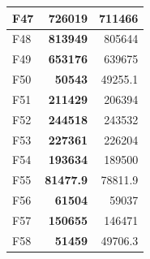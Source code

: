 \begin{table}[]
\begin{tabular}{l|r|r|}
\multicolumn{1}{|l|}{\cellcolor[HTML]{FCE6AB}F47}  & \cellcolor[HTML]{D3FFB6}\textbf{726019}                  & 711466                                                    \\ \hline
\multicolumn{1}{|l|}{\cellcolor[HTML]{FCE6AB}F48}  & \cellcolor[HTML]{D3FFB6}\textbf{813949}                  & 805644                                                    \\ \hline
\multicolumn{1}{|l|}{\cellcolor[HTML]{FCE6AB}F49}  & \cellcolor[HTML]{D3FFB6}\textbf{653176}                  & 639675                                                    \\ \hline
\multicolumn{1}{|l|}{\cellcolor[HTML]{FCE6AB}F50}  & \cellcolor[HTML]{D3FFB6}\textbf{50543}                   & 49255.1                                                   \\ \hline
\multicolumn{1}{|l|}{\cellcolor[HTML]{FCE6AB}F51}  & \cellcolor[HTML]{D3FFB6}\textbf{211429}                  & 206394                                                    \\ \hline
\multicolumn{1}{|l|}{\cellcolor[HTML]{FCE6AB}F52}  & \cellcolor[HTML]{D3FFB6}\textbf{244518}                  & 243532                                                    \\ \hline
\multicolumn{1}{|l|}{\cellcolor[HTML]{FCE6AB}F53}  & \cellcolor[HTML]{D3FFB6}\textbf{227361}                  & 226204                                                    \\ \hline
\multicolumn{1}{|l|}{\cellcolor[HTML]{FCE6AB}F54}  & \cellcolor[HTML]{D3FFB6}\textbf{193634}                  & 189500                                                    \\ \hline
\multicolumn{1}{|l|}{\cellcolor[HTML]{FCE6AB}F55}  & \cellcolor[HTML]{D3FFB6}\textbf{81477.9}                 & 78811.9                                                   \\ \hline
\multicolumn{1}{|l|}{\cellcolor[HTML]{FCE6AB}F56}  & \cellcolor[HTML]{D3FFB6}\textbf{61504}                   & 59037                                                     \\ \hline
\multicolumn{1}{|l|}{\cellcolor[HTML]{FCE6AB}F57}  & \cellcolor[HTML]{D3FFB6}\textbf{150655}                  & 146471                                                    \\ \hline
\multicolumn{1}{|l|}{\cellcolor[HTML]{FCE6AB}F58}  & \cellcolor[HTML]{D3FFB6}\textbf{51459}                   & 49706.3                                                   \\ \hline

\end{tabular}
\end{table}
